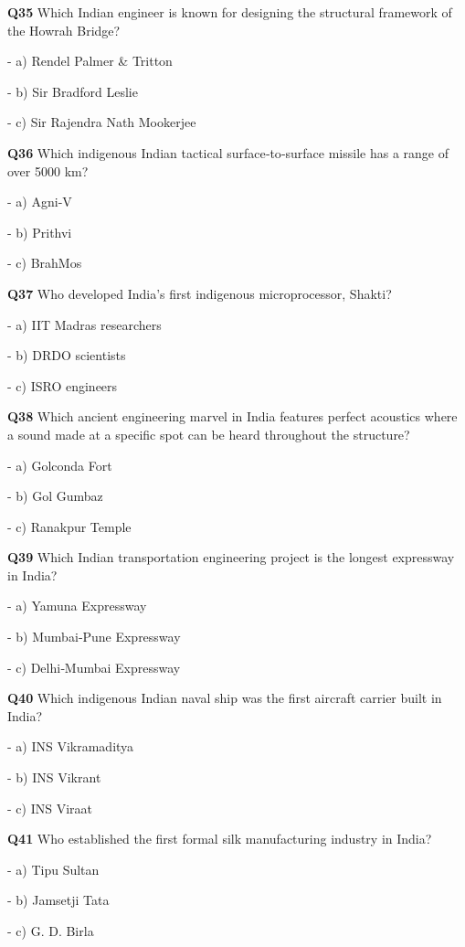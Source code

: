 \textbf{Q35} Which Indian engineer is known for designing the structural framework of the Howrah Bridge?\par
\quad - a) Rendel Palmer & Tritton\par
\quad - b) Sir Bradford Leslie\par
\quad - c) Sir Rajendra Nath Mookerjee\par

\textbf{Q36} Which indigenous Indian tactical surface‑to‑surface missile has a range of over 5000 km?\par
\quad - a) Agni‑V\par
\quad - b) Prithvi\par
\quad - c) BrahMos\par

\textbf{Q37} Who developed India's first indigenous microprocessor, Shakti?\par
\quad - a) IIT Madras researchers\par
\quad - b) DRDO scientists\par
\quad - c) ISRO engineers\par

\textbf{Q38} Which ancient engineering marvel in India features perfect acoustics where a sound made at a specific spot can be heard throughout the structure?\par
\quad - a) Golconda Fort\par
\quad - b) Gol Gumbaz\par
\quad - c) Ranakpur Temple\par

\textbf{Q39} Which Indian transportation engineering project is the longest expressway in India?\par
\quad - a) Yamuna Expressway\par
\quad - b) Mumbai‑Pune Expressway\par
\quad - c) Delhi‑Mumbai Expressway\par

\textbf{Q40} Which indigenous Indian naval ship was the first aircraft carrier built in India?\par
\quad - a) INS Vikramaditya\par
\quad - b) INS Vikrant\par
\quad - c) INS Viraat\par

\textbf{Q41} Who established the first formal silk manufacturing industry in India?\par
\quad - a) Tipu Sultan\par
\quad - b) Jamsetji Tata\par
\quad - c) G. D. Birla\par

